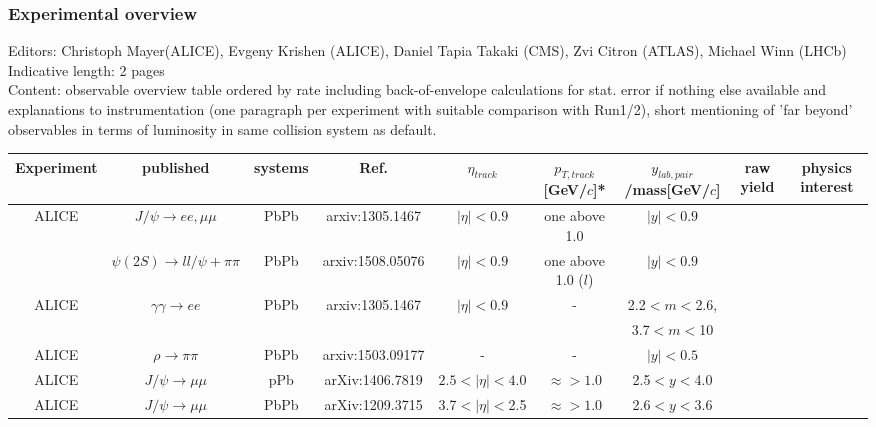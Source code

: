 \documentclass[../report.tex]{subfiles}
\begin{document}
\subsubsection{Experimental overview}
Editors: Christoph Mayer(ALICE), Evgeny Krishen (ALICE), Daniel Tapia Takaki (CMS), Zvi Citron (ATLAS), Michael Winn (LHCb)
Indicative length: 2 pages\\
Content: observable overview table ordered by rate including back-of-envelope calculations for stat. error if nothing else available and explanations to instrumentation (one paragraph per experiment with suitable comparison with Run1/2), short mentioning of 'far beyond' observables in terms of luminosity in same collision system as default.



\begin{table}[htbp]
 {\tiny
\centering
\begin{tabular}{|c|c|c|c|c|c|c|c|c|}
\hline
Experiment   & published                  & systems   & Ref.                                                               &$\eta_{track}$  &$p_{T,track}$[GeV/$c$]*& $y_{lab,pair}$/mass[GeV/$c$] & raw yield & physics interest\\
\hline
ALICE &$J/\psi \to e e,\mu \mu$       & PbPb     & arxiv:1305.1467   & $|\eta|<0.9$   & one above 1.0        & $|y|<0.9$    &  &                \\
             &$\psi(2S)\to ll/\psi+\pi\pi$& PbPb     & arxiv:1508.05076 &$|\eta|<0.9$    & one above 1.0 ($l$)  & $|y|<0.9$                   &     & \\
ALICE &$\gamma\gamma\to ee$        & PbPb     & arxiv:1305.1467   &$|\eta|<0.9$    & -                    & 2.2$<m<$2.6,    & &             \\
             &                            &          &                                                                    &                &                      & 3.7$<m<$10         & &           \\
ALICE &$\rho \to \pi\pi$           & PbPb     & arxiv:1503.09177 &   -            &  -                   & $|y|<0.5$        & &            \\  
ALICE   &$J/\psi \to \mu\mu$         & pPb      & arXiv:1406.7819  &$2.5<|\eta|<4.0$& $\approx >1.0$       & 2.5$<y<$4.0     & &              \\
ALICE   &$J/\psi \to \mu\mu$         & PbPb     &arXiv:1209.3715  &3.7$<|\eta|<$2.5& $\approx >1.0$       & 2.6$<y<$3.6         & &          \\

\end{tabular}}
\end{table}
\end{document}
